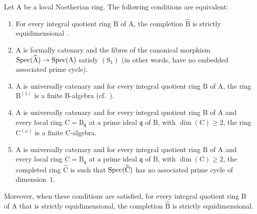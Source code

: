 \begin{theorem}[7.2.5]
\label{IV.7.2.5}
Let $\mathrm{A}$ be a local Noetherian ring.
The following conditions are equivalent:
\begin{enumerate}[label=\emph{\alph*)}]
  \item For every integral quotient ring $\mathrm{B}$ of $\mathrm{A}$, the completion $\widehat{\mathrm{B}}$ is strictly equidimensional .
  \item $\mathrm{A}$ is formally catenary  and the fibres of the canonical morphism $\operatorname{Spec}(\widehat{\mathrm{A}})\to\operatorname{Spec}(\mathrm{A})$ satisfy $(\mathrm{S}_1)$ (in other words, have no embedded associated prime cycle).
  \item $\mathrm{A}$ is universally catenary  and for every integral quotient ring $\mathrm{B}$ of $\mathrm{A}$, the ring $\mathrm{B}^{(1)}$ is a finite B-algebra (cf.\ ).
  \item $\mathrm{A}$ is universally catenary and for every integral quotient ring $\mathrm{B}$ of $\mathrm{A}$ and every local ring $\mathrm{C}=\mathrm{B}_\mathfrak{q}$ at a prime ideal $\mathfrak{q}$ of $\mathrm{B}$, with $\dim(\mathrm{C})\geqslant 2$, the ring $\mathrm{C}^{(\omega)}$ is a finite C-algebra.
  \item $\mathrm{A}$ is universally catenary and for every integral quotient ring $\mathrm{B}$ of $\mathrm{A}$ and every local ring $\mathrm{C}=\mathrm{B}_\mathfrak{q}$ at a prime ideal $\mathfrak{q}$ of $\mathrm{B}$, with $\dim(\mathrm{C})\geqslant 2$, the completed ring $\widehat{\mathrm{C}}$ is such that $\operatorname{Spec}(\widehat{\mathrm{C}})$ has no associated prime cycle of dimension~$1$.
\end{enumerate}
Moreover, when these conditions are satisfied, for every integral quotient ring $\mathrm{B}$ of $\mathrm{A}$ that is strictly equidimensional, the completion $\widehat{\mathrm{B}}$ is strictly equidimensional.
\end{theorem}

